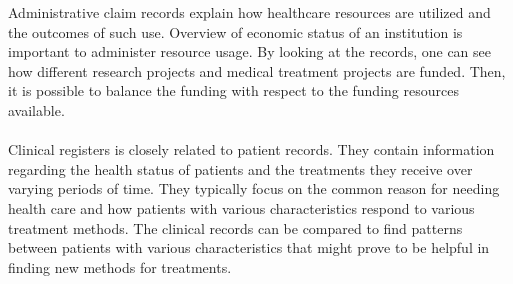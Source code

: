 Administrative claim records explain how healthcare resources are utilized and the outcomes of such use. Overview of economic status of an institution is important to administer resource usage. By looking at the records, one can see how different research projects and medical treatment projects are funded. Then, it is possible to balance the funding with respect to the funding resources available. 
\\\\
Clinical registers is closely related to patient records.\cite{geir} They contain information regarding the health status of patients and the treatments they receive over varying periods of time. They typically focus on the common reason for needing health care and how patients with various characteristics respond to various treatment methods. 
The clinical records can be compared to find patterns between patients with various characteristics that might prove to be helpful in finding new methods for treatments.



